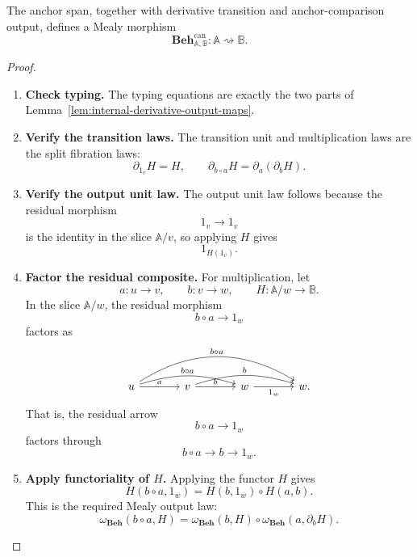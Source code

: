 \begin{theorem}
\label{thm:canonical-behaviour-mealy-morphism}
    The anchor span, together with derivative transition and anchor-comparison output, defines a Mealy morphism
    \[
        \mathbf{Beh}^{\mathrm{can}}_{\mathbb A,\mathbb B}:
        \mathbb A\rightsquigarrow\mathbb B.
    \]
\end{theorem}
\begin{proof}
    \leavevmode
    \begin{enumerate}
        \item \textbf{Check typing.} The typing equations are exactly the two parts of Lemma~\ref{lem:internal-derivative-output-maps}.

        \item \textbf{Verify the transition laws.} The transition unit and multiplication laws are the split fibration laws:
        \[
            \partial_{1_v}H=H,
            \qquad
            \partial_{b\circ a}H=\partial_a(\partial_bH).
        \]

        \item \textbf{Verify the output unit law.} The output unit law follows because the residual morphism
        \[
            1_v\to 1_v
        \]
        is the identity in the slice \(\mathbb A/v\), so applying \(H\) gives
        \[
            1_{H(1_v)}.
        \]

        \item \textbf{Factor the residual composite.} For multiplication, let
        \[
            a:u\to v,
            \qquad
            b:v\to w,
            \qquad
            H:\mathbb A/w\to\mathbb B.
        \]
        In the slice \(\mathbb A/w\), the residual morphism
        \[
            b\circ a\to 1_w
        \]
        factors as
        \[
            \begin{tikzcd}[column sep=large, row sep=large]
                    u
                        \arrow[r, "a"]
                        \arrow[rr, "b\circ a", bend left=17]
                        \arrow[rrr, "b\circ a", bend left=32]
                &
                    v
                        \arrow[r, "b"]
                        \arrow[rr, "b", bend left=17]
                &
                    w
                        \arrow[r, "1_w"']
                &
                    w.
            \end{tikzcd}
        \]
        That is, the residual arrow
        \[
            b\circ a\to 1_w
        \]
        factors through
        \[
            b\circ a\longrightarrow b\longrightarrow 1_w.
        \]

        \item \textbf{Apply functoriality of \(H\).} Applying the functor \(H\) gives
        \[
            H(b\circ a,1_w)
            =
            H(b,1_w)\circ H(a,b).
        \]
        This is the required Mealy output law:
        \[
            \omega_{\mathbf{Beh}}(b\circ a,H)
            =
            \omega_{\mathbf{Beh}}(b,H)
            \circ
            \omega_{\mathbf{Beh}}(a,\partial_bH).
        \]
    \end{enumerate}
\end{proof}

